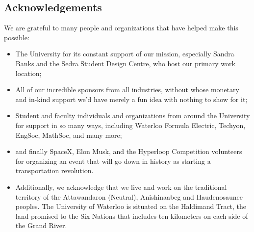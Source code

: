 \documentclass[main.tex]{subfiles}
\begin{document}
\subsection{Acknowledgements}

We are grateful to many people and organizations that have helped make this possible:
\begin{itemize}
	\item The University for its constant support of our mission, especially Sandra Banks and the Sedra Student Design Centre, who host our primary work location;
    
	\item All of our incredible sponsors from all industries, without whose monetary and in-kind support we'd have merely a fun idea with nothing to show for it;

	\item Student and faculty individuals and organizations from around the University for support in so many ways, including Waterloo Formula Electric, Techyon, EngSoc, MathSoc, and many more;

	\item and finally SpaceX, Elon Musk, and the Hyperloop Competition volunteers for organizing an event that will go down in history as starting a transportation revolution.

	\item Additionally, we acknowledge that we live and work on the traditional territory of the Attawandaron (Neutral), Anishinaabeg and Haudenosaunee peoples. The University of Waterloo is situated on the Haldimand Tract, the land promised to the Six Nations that includes ten kilometers on each side of the Grand River.
\end{itemize}

\newpage
\end{document}
